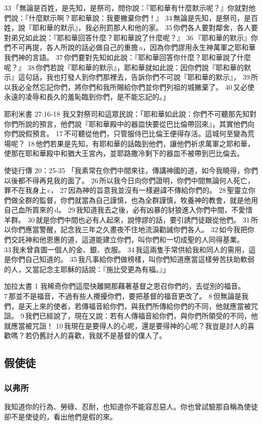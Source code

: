 33 「無論是百姓，是先知，是祭司，問你說：『耶和華有什麼默示呢？』你就對他們說：『什麼默示啊？耶和華說：我要撇棄你們！』 34 無論是先知，是祭司，是百姓，說『耶和華的默示』，我必刑罰那人和他的家。 35 你們各人要對鄰舍，各人要對弟兄如此說：『耶和華回答什麼？耶和華說了什麼呢？』 36 『耶和華的默示』你們不可再提，各人所說的話必做自己的重擔 a，因為你們謬用永生神萬軍之耶和華我們神的言語。 37 你們要對先知如此說：『耶和華回答你什麼？耶和華說了什麼呢？』 38 你們若說『耶和華的默示』，耶和華就如此說：因你們說『耶和華的默示』這句話，我也打發人到你們那裡去，告訴你們不可說『耶和華的默示』， 39 所以我必全然忘記你們，將你們和我所賜給你們並你們列祖的城撇棄了。 40 又必使永遠的凌辱和長久的羞恥臨到你們，是不能忘記的。」

耶利米書 27:16-18
我又對祭司和這眾民說：「耶和華如此說：你們不可聽那先知對你們所說的預言，他們說『耶和華殿中的器皿快要從巴比倫帶回來』，其實他們向你們說假預言。 17 不可聽從他們，只管服侍巴比倫王便得存活。這城何至變為荒場呢？ 18 他們若果是先知，有耶和華的話臨到他們，讓他們祈求萬軍之耶和華，使那在耶和華殿中和猶大王宮內，並耶路撒冷剩下的器皿不被帶到巴比倫去。

使徒行傳 20：25-35 
 「我素常在你們中間來往，傳講神國的道，如今我曉得，你們以後都不得再見我的面了。 26 所以我今日向你們證明，你們中間無論何人死亡，罪不在我身上 c， 27 因為神的旨意我並沒有一樣避諱不傳給你們的。 28 聖靈立你們做全群的監督，你們就當為自己謹慎，也為全群謹慎，牧養神的教會，就是他用自己血所買來的 d。 29 我知道我去之後，必有凶暴的豺狼進入你們中間，不愛惜羊群。 30 就是你們中間也必有人起來，說悖謬的話，要引誘門徒跟從他們。 31 所以你們應當警醒，記念我三年之久晝夜不住地流淚勸誡你們各人。 32 如今我把你們交託神和他恩惠的道，這道能建立你們，叫你們和一切成聖的人同得基業。 33 我未曾貪圖一個人的金、銀、衣服。 34 我這兩隻手常供給我和同人的需用，這是你們自己知道的。 35 我凡事給你們做榜樣，叫你們知道應當這樣勞苦扶助軟弱的人，又當記念主耶穌的話說：『施比受更為有福。』」
 
 加拉太書 1
 我稀奇你們這麼快離開那藉著基督之恩召你們的，去從別的福音。 7 那並不是福音，不過有些人攪擾你們，要把基督的福音更改了。 8 但無論是我們，是天上來的使者，若傳福音給你們，與我們所傳給你們的不同，他就應當被咒詛。 9 我們已經說了，現在又說：若有人傳福音給你們，與你們所領受的不同，他就應當被咒詛！ 10 我現在是要得人的心呢，還是要得神的心呢？我豈是討人的喜歡嗎？若仍舊討人的喜歡，我就不是基督的僕人了。
 
 
 \subsection{假使徒}
 \subsubsection{以弗所 }
 我知道你的行為、勞碌、忍耐，也知道你不能容忍惡人。你也曾試驗那自稱為使徒卻不是使徒的，看出他們是假的來。
 

